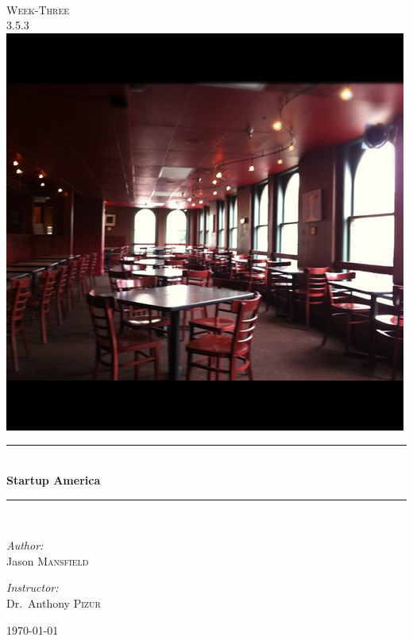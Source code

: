 \message{ !name(EC320-WK3-3.5.3.tex)}\documentclass[pdftex,12pt,a4paper]{report}
\newcommand{\HRule}{\rule{\linewidth}{0.5mm}}
\begin{document}

%
\begin{titlepage}
\begin{center}


\textsc{\color{Sepia}{\LARGE EC~320}}\\[1.5cm]
\textsc{\Large Week-Three}\\[0.5cm]
\textsc{\Large 3.5.3}\\[0.5cm]
\includegraphics[scale=0.5]{GDP}\\
\HRule \\[0.4cm]
{ \huge \bfseries Startup America}\\[0.4cm]
\HRule \\[1.5cm]


\begin{minipage}{0.4\textwidth}
\begin{flushleft} \large
\emph{Author:}\\
Jason \textsc{Mansfield}
\end{flushleft}
\end{minipage}
\begin{minipage}{0.4\textwidth}
\begin{flushright} \large
\emph{Instructor:} \\
Dr.~Anthony \textsc{Pizur}
\end{flushright}
\end{minipage}

\vfill

{\large \today}

\end{center}
\end{titlepage}
\end{document}
